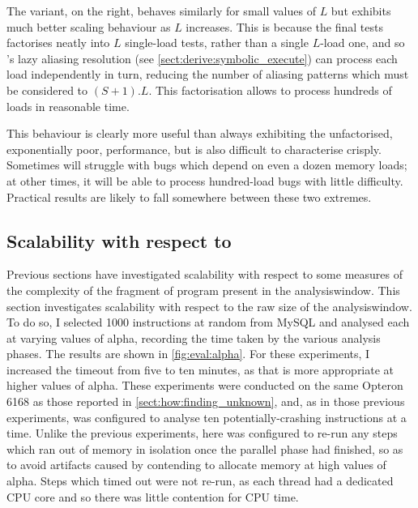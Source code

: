 The  variant, on the right, behaves similarly for small
values of $L$ but exhibits much better scaling behaviour as $L$
increases.  This is because the final tests factorises neatly into $L$
single-load tests, rather than a single $L$-load one, and so
{\implementation}'s lazy aliasing resolution (see
\autoref{sect:derive:symbolic_execute}) can process each load
independently in turn, reducing the number of aliasing patterns which
must be considered to $(S+1).L$.  This factorisation allows
{\implementation} to process hundreds of loads in reasonable time.

This behaviour is clearly more useful than always exhibiting the
unfactorised, exponentially poor, performance, but is also difficult
to characterise crisply.  Sometimes {\implementation} will struggle
with bugs which depend on even a dozen memory loads; at other times,
it will be able to process hundred-load bugs with little difficulty.
Practical results are likely to fall somewhere between these two
extremes.

\subsection{Scalability with respect to }



\noindent
Previous sections have investigated scalability with respect to some
measures of the complexity of the fragment of program present in the
\gls{analysiswindow}.  This section investigates scalability with
respect to the raw size of the \gls{analysiswindow}.  To do so, I
selected 1000 instructions at random from MySQL and analysed each at
varying values of \gls{alpha}, recording the time taken by the various
analysis phases.  The results are shown in \autoref{fig:eval:alpha}.
For these experiments, I increased the timeout from five to ten
minutes, as that is more appropriate at higher values of \gls{alpha}.
These experiments were conducted on the same Opteron 6168 as those
reported in \autoref{sect:how:finding_unknown}, and, as in those
previous experiments, {\implementation} was configured to analyse ten
potentially-crashing instructions at a time.  Unlike the previous
experiments, here {\implementation} was configured to re-run any steps
which ran out of memory in isolation once the parallel phase had
finished, so as to avoid artifacts caused by contending to allocate
memory at high values of \gls{alpha}.  Steps which timed out were not
re-run, as each thread had a dedicated CPU core and so there was
little contention for CPU time.

